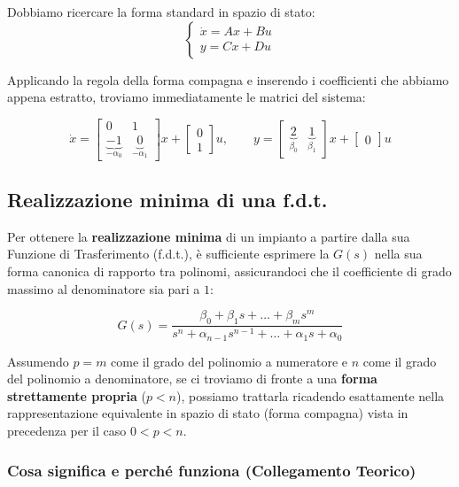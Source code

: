 \documentclass[a4paper,12pt]{article}
\begin{document}
	Dobbiamo ricercare la forma standard in spazio di stato:
	\[
	\begin{cases} 
		\dot{x} = Ax + Bu \\ 
		y = Cx + Du 
	\end{cases}
	\]
	
	Applicando la regola della forma compagna e inserendo i coefficienti che abbiamo appena estratto, troviamo immediatamente le matrici del sistema:
	
	\[
	\dot{x} = 
	\begin{bmatrix} 
		0 & 1 \\ 
		\underbrace{-1}_{-\alpha_0} & \underbrace{0}_{-\alpha_1} 
	\end{bmatrix} 
	x + 
	\begin{bmatrix} 
		0 \\ 
		1 
	\end{bmatrix} 
	u, 
	\qquad 
	y = 
	\begin{bmatrix} 
		\underbrace{2}_{\beta_0} & \underbrace{1}_{\beta_1} 
	\end{bmatrix} 
	x + \begin{bmatrix} 0 \end{bmatrix} u
	\]
	
	\subsection{Realizzazione minima di una f.d.t.}
	
	Per ottenere la \textbf{realizzazione minima} di un impianto a partire dalla sua Funzione di Trasferimento (f.d.t.), è sufficiente esprimere la $G(s)$ nella sua forma canonica di rapporto tra polinomi, assicurandoci che il coefficiente di grado massimo al denominatore sia pari a $1$:
	
	\[
	G(s) = \frac{\beta_0 + \beta_1 s + \dots + \beta_m s^m}{s^n + \alpha_{n-1} s^{n-1} + \dots + \alpha_1 s + \alpha_0}
	\]
	
	Assumendo $p = m$ come il grado del polinomio a numeratore e $n$ come il grado del polinomio a denominatore, se ci troviamo di fronte a una \textbf{forma strettamente propria} ($p < n$), possiamo trattarla ricadendo esattamente nella rappresentazione equivalente in spazio di stato (forma compagna) vista in precedenza per il caso $0 < p < n$.
	
	\vspace{0.5cm}
	
	\subsubsection*{Cosa significa e perché funziona (Collegamento Teorico)}
	
\end{document}
